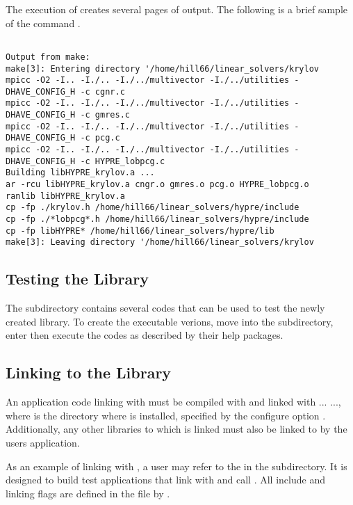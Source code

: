 The execution of  creates several pages of output.  The following is a brief 
sample of the command .
\begin{verbatim}

Output from make:
make[3]: Entering directory '/home/hill66/linear_solvers/krylov
mpicc -O2 -I.. -I./.. -I./../multivector -I./../utilities -DHAVE_CONFIG_H -c cgnr.c
mpicc -O2 -I.. -I./.. -I./../multivector -I./../utilities -DHAVE_CONFIG_H -c gmres.c
mpicc -O2 -I.. -I./.. -I./../multivector -I./../utilities -DHAVE_CONFIG_H -c pcg.c
mpicc -O2 -I.. -I./.. -I./../multivector -I./../utilities -DHAVE_CONFIG_H -c HYPRE_lobpcg.c
Building libHYPRE_krylov.a ...
ar -rcu libHYPRE_krylov.a cngr.o gmres.o pcg.o HYPRE_lobpcg.o
ranlib libHYPRE_krylov.a
cp -fp ./krylov.h /home/hill66/linear_solvers/hypre/include
cp -fp ./*lobpcg*.h /home/hill66/linear_solvers/hypre/include
cp -fp libHYPRE* /home/hill66/linear_solvers/hypre/lib
make[3]: Leaving directory '/home/hill66/linear_solvers/krylov

\end{verbatim}


\subsection{Testing the Library} 

The  subdirectory contains several codes that can be used to test
the newly created \hypre{} library.  To create the executable verions, move into
the  subdirectory, enter  then execute the codes as described
by their help packages.


\subsection{Linking to the Library}

An application code linking with \hypre{} must be compiled with  
and linked with ... 
..., where  is the
directory where \hypre{} is installed, specified by the configure
option .  Additionally, any other libraries to which \hypre{} 
is linked must also be linked to by the users application. 

As an example of linking with \hypre{}, a user may refer to the  in the 
 subdirectory.  It is designed to build test applications that link with and 
call \hypre{}.  All include and linking flags are defined in the  
file by .


